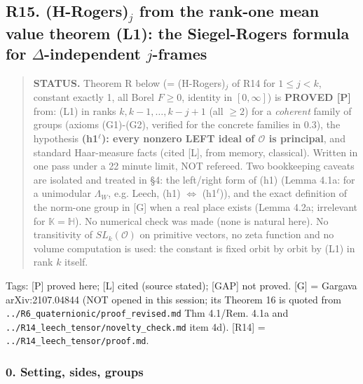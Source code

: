 \hypertarget{r15.-h-rogers_j-from-the-rank-one-mean-value-theorem-l1-the-siegel-rogers-formula-for-delta-independent-j-frames}{%
\subsection*{\texorpdfstring{R15. (H-Rogers)\(_j\) from the rank-one mean value theorem (L1): the Siegel-Rogers formula for \(\Delta\)-independent \(j\)-frames}{R15. (H-Rogers)\_j from the rank-one mean value theorem (L1): the Siegel-Rogers formula for \textbackslash Delta-independent j-frames}}\label{r15.-h-rogers_j-from-the-rank-one-mean-value-theorem-l1-the-siegel-rogers-formula-for-delta-independent-j-frames}}

\begin{quote}
\textbf{STATUS.} Theorem R below (= (H-Rogers)\(_j\) of R14 for \(1\le j<k\), constant exactly 1, all Borel \(F\ge0\), identity in \([0,\infty]\)) is \textbf{PROVED {[}P{]}} from: (L1) in ranks \(k,k-1,\dots,k-j+1\) (all \(\ge2\)) for a \emph{coherent} family of groups (axioms (G1)-(G2), verified for the concrete families in 0.3), the hypothesis \textbf{(h1\(^\ell\)): every nonzero LEFT ideal of \(\mathcal O\) is principal}, and standard Haar-measure facts (cited {[}L{]}, from memory, classical). Written in one pass under a 22 minute limit, NOT refereed. Two bookkeeping caveats are isolated and treated in §4: the left/right form of (h1) (Lemma 4.1a: for a unimodular \(\Lambda_W\), e.g. Leech, (h1) \(\iff\) (h1\(^\ell\))), and the exact definition of the norm-one group in {[}G{]} when a real place exists (Lemma 4.2a; irrelevant for \(\mathbb K=\mathbb H\)). No numerical check was made (none is natural here). No transitivity of \(SL_k(\mathcal O)\) on primitive vectors, no zeta function and no volume computation is used: the constant is fixed orbit by orbit by (L1) in rank \(k\) itself.
\end{quote}

Tags: {[}P{]} proved here; {[}L{]} cited (source stated); {[}GAP{]} not proved. {[}G{]} = Gargava arXiv:2107.04844 (NOT opened in this session; its Theorem 16 is quoted from \texttt{../R6\_quaternionic/proof\_revised.md} Thm 4.1/Rem. 4.1a and \texttt{../R14\_leech\_tensor/novelty\_check.md} item 4d). {[}R14{]} = \texttt{../R14\_leech\_tensor/proof.md}.

\hypertarget{setting-sides-groups}{%
\subsubsection*{0. Setting, sides, groups}\label{setting-sides-groups}}

